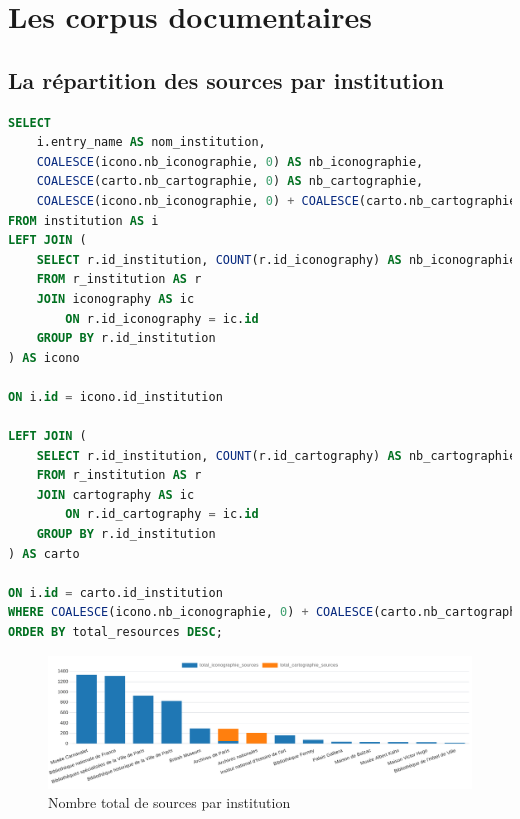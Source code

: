 \section{Les corpus documentaires}
\subsection{La répartition des sources par institution}
\begin{lstlisting}[language=SQL, caption=Requête SQL pour nombre total de sources par institution]
SELECT 
    i.entry_name AS nom_institution,
    COALESCE(icono.nb_iconographie, 0) AS nb_iconographie,
    COALESCE(carto.nb_cartographie, 0) AS nb_cartographie,
    COALESCE(icono.nb_iconographie, 0) + COALESCE(carto.nb_cartographie, 0) AS total_resources
FROM institution AS i
LEFT JOIN (
    SELECT r.id_institution, COUNT(r.id_iconography) AS nb_iconographie
    FROM r_institution AS r 
    JOIN iconography AS ic 
        ON r.id_iconography = ic.id 
    GROUP BY r.id_institution
) AS icono 

ON i.id = icono.id_institution

LEFT JOIN (
    SELECT r.id_institution, COUNT(r.id_cartography) AS nb_cartographie 
    FROM r_institution AS r 
    JOIN cartography AS ic 
        ON r.id_cartography = ic.id 
    GROUP BY r.id_institution
) AS carto 

ON i.id = carto.id_institution
WHERE COALESCE(icono.nb_iconographie, 0) + COALESCE(carto.nb_cartographie, 0) > 50
ORDER BY total_resources DESC; \end{lstlisting}
\begin{figure}[h!]
    \centering
    \includegraphics[width=1\linewidth]{images/graphiques/total_source_institution.png}
    \caption{Nombre total de sources par institution}
    \label{fig:total_sources_institution}
\end{figure}

